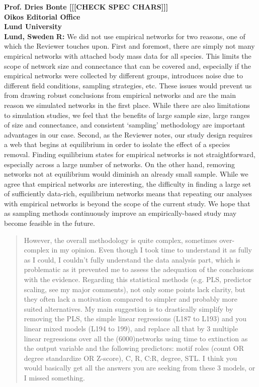 \documentclass[12pt]{letter}
\begin{document}
\begin{letter}{\bf Prof. Dries Bonte [[[CHECK SPEC CHARS]]]\\
Oikos Editorial Office \\
Lund University \\
Lund, Sweden}
  \textbf{R:} We did not use empirical networks for two reasons, one of which the Reviewer touches upon. First and foremost, there are simply not many empirical networks with attached body mass data for all species. This limits the scope of network size and connectance that can be covered and, especially if the empirical networks were collected by different groups, introduces noise due to different field conditions, sampling strategies, etc. These issues would prevent us from drawing robust conclusions from empirical networks and are the main reason we simulated networks in the first place. While there are also limitations to simulation studies, we feel that the benefits of large sample size, large ranges of size and connectance, and consistent `sampling' methodology are important advantages in our case.
  Second, as the Reviewer notes, our study design requires a web that begins at equilibrium in order to isolate the effect of a species removal. Finding equilibrium states for empirical networks is not straightforward, especially across a large number of networks. On the other hand, removing networks not at equilibrium would diminish an already small sample. While we agree that empirical networks are interesting, the difficulty in finding a large set of sufficiently data-rich, equilibrium networks means that repeating our analyses with empirical networks is beyond the scope of the current study.
  We hope that as sampling methods continuously improve an empirically-based study may become feasible in the future.



  \begin{quotation}
  However, the overall methodology is quite complex, sometimes over-complex in my opinion. Even though I took time to understand it as fully as I could, I couldn’t fully understand the data analysis part, which is problematic as it prevented me to assess the adequation of the conclusions with the evidence. Regarding this statistical methods (e.g. PLS, predictor scaling, see my major comments), not only some points lack clarity, but they often lack a motivation compared to simpler and probably more suited alternatives. My main suggestion is to drastically simplify by removing the PLS, the simple linear regressions (L187 to L193) and you linear mixed models (L194 to 199), and replace all that by 3 multiple linear regressions over all the (6000)networks using time to extinction as the output variable and the following predictors: motif roles (count OR degree standardize OR Z-score), C, R, C:R, degree, STL. I think you would basically get all the answers you are seeking from these 3 models, or I missed something.
  \end{quotation}



\end{letter}
\end{document}
